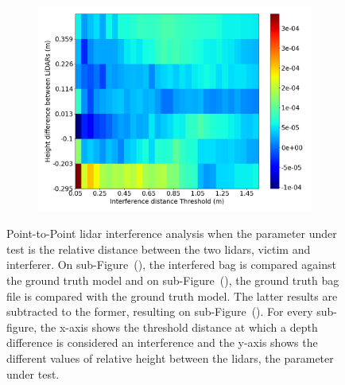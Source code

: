 \begin{figure}[!ht]
\begin{subfigure}[c]{0.45\textwidth}
	\label{fig:height:ground-truth-color-mesh}
\end{subfigure}
\\ \vspace{4mm}
\begin{subfigure}[c]{0.6\textwidth}
	\includegraphics[width=\textwidth]{img/lidar-interference/height/difference_ground_truth_interference_measurement.png}
\caption{}%
	\label{fig:height:difference-color-mesh}
\end{subfigure}

\caption[Point-to-Point analysis when the relative height  between \acp{lidar} optical center is variated.]{Point-to-Point \ac{lidar} interference analysis when the parameter under test is the relative distance between the two \acp{lidar}, victim and interferer. On sub-Figure~(), the interfered bag is compared against the ground truth model and on sub-Figure~(), the ground truth bag file is compared with the ground truth model. The latter results are subtracted to the former, resulting on sub-Figure~(). For every sub-figure, the x-axis shows the threshold distance at which a depth difference is considered an interference and the y-axis shows the different values of relative height between the \acp{lidar}, the parameter under test.}
\label{fig:height:color-mesh}
\end{figure}


